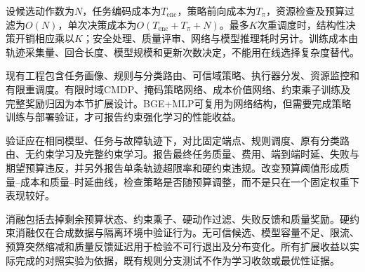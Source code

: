 设候选动作数为$N$，任务编码成本为$T_{\mathrm{enc}}$，策略前向成本为$T_{\pi}$，资源检查及预算过滤为$O(N)$，单次决策成本为$O(T_{\mathrm{enc}}+T_{\pi}+N)$。最多$K$次重调度时，结构性决策开销相应乘以$K$；安全处理、质量评审、网络与模型推理耗时另计。训练成本由轨迹采集量、回合长度、模型规模和更新次数决定，不能用在线选择复杂度替代。

现有工程包含任务画像、规则与分类路由、可信域策略、执行器分发、资源监控和有限重调度。有限时域CMDP、掩码策略网络、成本价值网络、约束乘子训练及完整奖励归因为本节扩展设计。BGE+MLP可复用为网络结构，但需要完成策略训练与部署验证，才可报告约束强化学习的性能收益。

验证应在相同模型、任务与故障轨迹下，对比固定端点、规则调度、原有分类路由、无约束学习及完整约束学习。报告最终任务质量、费用、端到端时延、失败与期望预算违反，并另外报告单条轨迹超限率和硬约束违规。改变预算阈值形成质量--成本和质量--时延曲线，检查策略是否随预算调整，而不是只在一个固定权重下表现较好。

消融包括去掉剩余预算状态、约束乘子、硬动作过滤、失败反馈和质量奖励。硬约束消融仅在合成数据与隔离环境中验证行为。无可信候选、模型容量不足、限流、预算突然缩减和质量反馈延迟用于检验不可行退出及分布变化。所有扩展收益以实际完成的对照实验为依据，既有规则分支测试不作为学习收敛或最优性证据。

